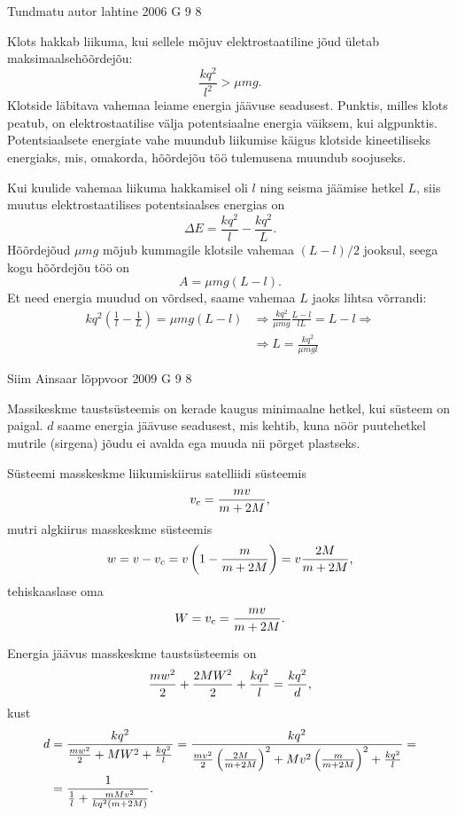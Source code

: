 \documentclass[11pt, twoside]{article}
\begin{document}
{%
{Tundmatu autor} %
{lahtine} %
{2006} %
{G 9} %
{8} %
{

\ifSolution
Klots hakkab liikuma, kui sellele mõjuv elektrostaatiline jõud ületab maksimaalsehõõrdejõu:
\[
\frac{kq^2}{l^2} > \mu mg.
\]
Klotside läbitava vahemaa leiame energia jäävuse seadusest. Punktis, milles klots peatub, on elektrostaatilise välja potentsiaalne energia väiksem, kui algpunktis. Potentsiaalsete energiate vahe muundub liikumise käigus klotside kineetiliseks energiaks, mis, omakorda, hõõrdejõu töö tulemusena muundub soojuseks.

Kui kuulide vahemaa liikuma hakkamisel oli $l$ ning seisma jäämise hetkel $L$, siis muutus elektrostaatilises potentsiaalses energias on
\[
\Delta E = \frac{kq^2}{l} - \frac{kq^2}{L}.
\]
Hõõrdejõud $\mu mg$ mõjub kummagile klotsile vahemaa $(L-l)/2$ jooksul, seega kogu
hõõrdejõu töö on
\[
A = \mu mg (L - l).
\]
Et need energia muudud on võrdsed, saame vahemaa $L$ jaoks lihtsa võrrandi:
\[
\begin{aligned}
k q^{2}\left(\frac{1}{l}-\frac{1}{L}\right)=\mu m g(L-l) &\Rightarrow \frac{k q^{2}}{\mu m g} \frac{L-l}{l L}=L-l \Rightarrow\\
&\Rightarrow L=\frac{k q^{2}}{\mu m g l}
\end{aligned}
\]
\fi
}

{Siim Ainsaar} %
{lõppvoor} %
{2009} %
{G 9} %
{8} %
{

\ifSolution
Massikeskme taustsüsteemis on kerade kaugus minimaalne hetkel, kui süsteem on
paigal. $d$ saame energia jäävuse seadusest, mis kehtib, kuna nöör puutehetkel
mutrile (sirgena) jõudu ei avalda ega muuda nii põrget plastseks.

Süsteemi masskeskme liikumiskiirus satelliidi süsteemis
\[ v_c = \frac{m v}{m+2M} \text, \]
mutri algkiirus masskeskme süsteemis
\[ w = v - v_c = v \left(1 - \frac{m}{m+2M}\right) = v \frac{2M}{m+2M} \text, \]
tehiskaaslase oma
\[ W = v_c = \frac{m v}{m+2M} \text. \]

Energia jäävus masskeskme taustsüsteemis on
\[
\frac{m w^2}{2} + \frac{2M W^2}{2} + \frac{k q^2}{l} = \frac{k q^2}{d} \text,
\]
kust
\begin{align*}
d &= \frac{k q^2}{\frac{m w^2}{2} + M W^2 + \frac{k q^2}{l}} =
\frac{k q^2}{\frac{m v^2}{2} \left(\frac{2M}{m+2M}\right)^2 + M v^2
	\left(\frac{m}{m+2M}\right)^2 + \frac{k q^2}{l}} = \\
&= \frac{1}{\frac{1}{l} + \frac{m M v^2}{k q^2 (m+2M)}}
\text.
\end{align*}

}}
\end{document}
